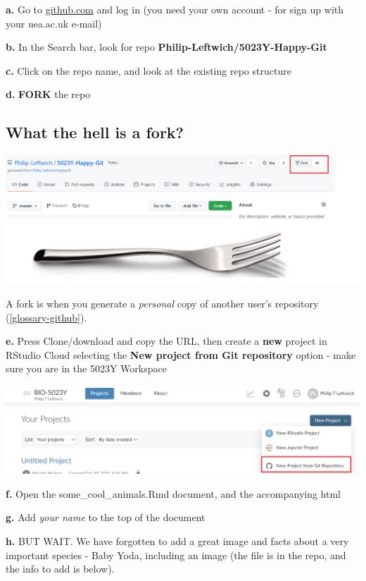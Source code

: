 \documentclass[
]{book}
\begin{document}
\textbf{a.} Go to \href{https://github.com/}{github.com} and log in (you need your own account - for sign up with your uea.ac.uk e-mail)

\textbf{b.} In the Search bar, look for repo \textbf{Philip-Leftwich/5023Y-Happy-Git}

\textbf{c.} Click on the repo name, and look at the existing repo structure

\textbf{d.} \textbf{FORK} the repo

\hypertarget{what-the-hell-is-a-fork}{%
\subsection{What the hell is a fork?}\label{what-the-hell-is-a-fork}}

\includegraphics[width=27.68in]{images/fork}

A fork is when you generate a \emph{personal} copy of another user's repository (\ref{glossary-github}).

\textbf{e.} Press Clone/download and copy the URL, then create a \textbf{new} project in RStudio Cloud selecting the \textbf{New project from Git repository} option - make sure you are in the 5023Y Workspace

\includegraphics[width=25.46in]{images/new-project}

\textbf{f.} Open the some\_cool\_animals.Rmd document, and the accompanying html

\textbf{g.} Add \emph{your name} to the top of the document

\textbf{h.} BUT WAIT. We have forgotten to add a great image and facts about a very important species - Baby Yoda, including an image (the file is in the repo, and the info to add is below).
\end{document}
